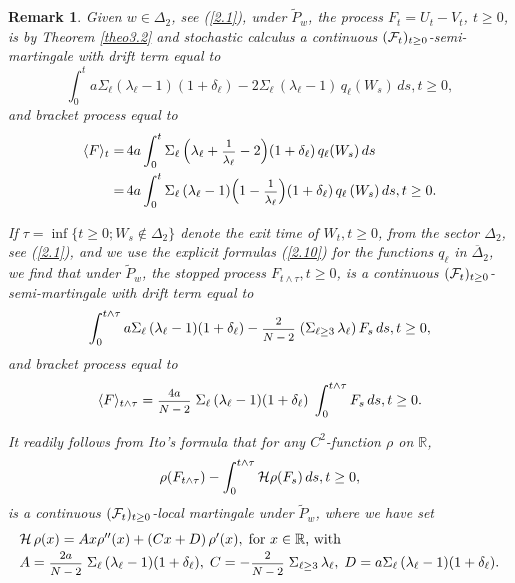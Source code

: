 \documentclass[12pt,leqno]{article}
\def\IR{{\mathbb R}}
\def\n{\noindent}
\def\dis{\displaystyle}
\def\ov{\overline}
\def\f{\footnotesize}
\def\wt{\widetilde}
\def\cH{{\cal H}}
\def\cF{{\cal F}}
\newtheorem{remark}[theorem]{Remark}
\begin{document}
\begin{remark}\label{rem3.5} \rm Given $w \in \Delta_2$, see (\ref{2.1}), under $\wt{P}_w$, the process $F_t = U_t - V_t$, $t \ge 0$, is by Theorem \ref{theo3.2} and stochastic calculus a continuous $(\cF_t)_{t \ge 0}$-semi-martingale with drift term equal to
\begin{equation}\label{3.32}
\dis\int^t_0 a \Sigma_\ell (\lambda_\ell -1)(1 + \delta_\ell) - 2 \Sigma_\ell \,(\lambda_\ell - 1) \, q_\ell (W_s) \, ds, t \ge 0,
\end{equation}
and bracket process equal to
\begin{equation}\label{3.33}
\begin{split}
\langle F\rangle_t =  &\,4 a \dis\int^t_0 \Sigma_\ell \, \Big(\lambda_\ell + \mbox{\f $\dis\frac{1}{\lambda_\ell}$} - 2 \Big) ( 1 + \delta_\ell) \, q_\ell (W_s) \, ds 
\\
= & \,4 a \dis\int^t_0  \Sigma_\ell \, (\lambda_\ell - 1) \Big(1 - \mbox{\f $\dis\frac{1}{\lambda_\ell}$}\Big) ( 1 + \delta_\ell) \, q_\ell \,(W_s) \, ds, t \ge 0.
\end{split}
\end{equation}

\n
If $\tau = \inf\{ t \ge 0; W_s \notin \Delta_2\}$ denote the exit time of $W_t, t \ge 0$, from the sector $\Delta_2$, see (\ref{2.1}), and we use the explicit formulas (\ref{2.10}) for the functions $q_\ell$ in $\ov{\Delta}_2$, we find that under $\wt{P}_w$, the stopped process $F_{t \wedge \tau}, t \ge 0$, is a continuous $(\cF_t)_{t \ge 0}$-semi-martingale with drift term equal to
\begin{equation}\label{3.34}
\dis\int_0^{t \wedge \tau} a \Sigma_\ell \,(\lambda_\ell - 1)(1 + \delta_\ell) - \mbox{\f $\dis\frac{2}{N-2}$} \;(\Sigma_{\ell \ge 3} \,\lambda_\ell) \, F_s \, ds, t \ge 0,
\end{equation}
and bracket process equal to
\begin{equation}\label{3.35}
\langle F \rangle_{t \wedge \tau} = \mbox{\f $\dis\frac{4a}{N-2}$} \; \Sigma_\ell \, (\lambda_\ell - 1)(1 + \delta_\ell) \; \dis\int_0^{t \wedge \tau} F_s \, ds, t \ge 0.
\end{equation}

\n
It readily follows from Ito's formula that for any $C^2$-function $\rho$ on $\IR$, 
\begin{equation}\label{3.36}
\rho (F_{t \wedge \tau}) - \dis\int^{t \wedge \tau}_0 \cH \rho(F_s) \, ds, t \ge 0,
\end{equation}
is a continuous $(\cF_t)_{t \ge 0}$-local martingale under $\wt{P}_w$, where we have set 
\begin{equation}\label{3.37}
\begin{array}{l}
\cH \, \rho(x) = A x \rho^{\prime\prime}(x) + (C x + D) \, \rho^\prime(x), \;\mbox{for $x \in \IR$, with}
\\[0.5ex]
A = \mbox{\f $\dis\frac{2a}{N-2}$} \; \Sigma_\ell\, (\lambda_\ell - 1) (1 + \delta_\ell), \; C = - \mbox{\f $\dis\frac{2}{N-2}$} \; \Sigma_{\ell \ge 3} \, \lambda_\ell, \; D = a \Sigma_\ell \, (\lambda_\ell -1 ) (1 + \delta_\ell).
\end{array}
\end{equation}


\end{remark}
\end{document}

